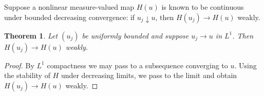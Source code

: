\documentclass{article}
\newtheorem{theorem}{Theorem}
\begin{document}
Suppose a nonlinear measure-valued map $H(u)$ is known to be continuous under
bounded decreasing convergence: if $u_j\downarrow u$, then $H(u_j)\to H(u)$ weakly.

\begin{theorem}\label{thm:limit}
Let $(u_j)$ be uniformly bounded and suppose $u_j\to u$ in $L^1$. Then
$H(u_j)\to H(u)$ weakly.
\end{theorem}
\begin{proof}
By $L^1$ compactness we may pass to a subsequence converging to $u$. Using the
stability of $H$ under decreasing limits, we pass to the limit and obtain
$H(u_j)\to H(u)$ weakly.
\end{proof}
\end{document}
